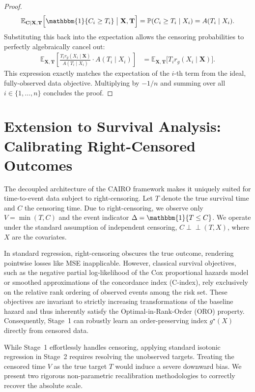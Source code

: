 \documentclass[11pt]{article}
\theoremstyle{plain}
\theoremstyle{plain}
\theoremstyle{plain}
\theoremstyle{plain}
\theoremstyle{plain}
\theoremstyle{plain}
\theoremstyle{plain}
\begin{document}
\begin{proof}
\begin{align}
    \mathbb{E}_{\mathbf{C} \mid \mathbf{X}, \mathbf{T}} \Big[ \mathbbm{1}\{C_i \ge T_i\} \;\big|\; \mathbf{X}, \mathbf{T} \Big] = \mathbb{P}(C_i \ge T_i \mid X_i) = A(T_i \mid X_i).
\end{align}
Substituting this back into the expectation allows the censoring probabilities to perfectly algebraically cancel out:
\begin{align}
    \mathbb{E}_{\mathbf{X}, \mathbf{T}} \left[ \frac{T_i r_g(X_i \mid \mathbf{X})}{A(T_i \mid X_i)} \cdot A(T_i \mid X_i) \right] &= \mathbb{E}_{\mathbf{X}, \mathbf{T}} \Big[ T_i r_g(X_i \mid \mathbf{X}) \Big].
\end{align}
This expression exactly matches the expectation of the $i$-th term from the ideal, fully-observed data objective. Multiplying by $-1/n$ and summing over all $i \in \{1, \dots, n\}$ concludes the proof.
\end{proof} 



\section{Extension to Survival Analysis: Calibrating Right-Censored Outcomes}
\label{sec:survival_extension}

The decoupled architecture of the \textsc{CAIRO} framework makes it uniquely suited for time-to-event data subject to right-censoring. Let $T$ denote the true survival time and $C$ the censoring time. Due to right-censoring, we observe only $V = \min(T, C)$ and the event indicator $\Delta = \mathbbm{1}\{T \le C\}$. We operate under the standard assumption of independent censoring, $C \perp\!\!\!\perp (T, X)$, where $X$ are the covariates.

In standard regression, right-censoring obscures the true outcome, rendering pointwise losses like MSE inapplicable. However, classical survival objectives, such as the negative partial log-likelihood of the Cox proportional hazards model \citep{cox1972regression} or smoothed approximations of the concordance index (C-index), rely exclusively on the relative rank ordering of observed events among the risk set. These objectives are invariant to strictly increasing transformations of the baseline hazard and thus inherently satisfy the Optimal-in-Rank-Order (ORO) property. Consequently, Stage~1 can robustly learn an order-preserving index $g^{\star}(X)$ directly from censored data.

While Stage~1 effortlessly handles censoring, applying standard isotonic regression in Stage~2 requires resolving the unobserved targets. Treating the censored time $V$ as the true target $T$ would induce a severe downward bias. We present two rigorous non-parametric recalibration methodologies to correctly recover the absolute scale.
\end{document}
